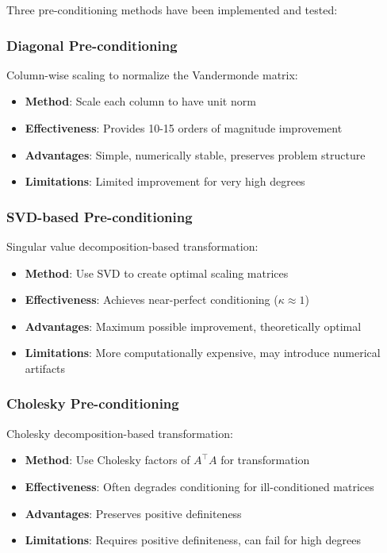 \documentclass[11pt,a4paper]{article}
\begin{document}
Three pre-conditioning methods have been implemented and tested:

\subsubsection{Diagonal Pre-conditioning}

Column-wise scaling to normalize the Vandermonde matrix:
\begin{itemize}
    \item \textbf{Method}: Scale each column to have unit norm
    \item \textbf{Effectiveness}: Provides 10-15 orders of magnitude improvement
    \item \textbf{Advantages}: Simple, numerically stable, preserves problem structure
    \item \textbf{Limitations}: Limited improvement for very high degrees
\end{itemize}

\subsubsection{SVD-based Pre-conditioning}

Singular value decomposition-based transformation:
\begin{itemize}
    \item \textbf{Method}: Use SVD to create optimal scaling matrices
    \item \textbf{Effectiveness}: Achieves near-perfect conditioning ($\kappa \approx 1$)
    \item \textbf{Advantages}: Maximum possible improvement, theoretically optimal
    \item \textbf{Limitations}: More computationally expensive, may introduce numerical artifacts
\end{itemize}

\subsubsection{Cholesky Pre-conditioning}

Cholesky decomposition-based transformation:
\begin{itemize}
    \item \textbf{Method}: Use Cholesky factors of $A^\top A$ for transformation
    \item \textbf{Effectiveness}: Often degrades conditioning for ill-conditioned matrices
    \item \textbf{Advantages}: Preserves positive definiteness
    \item \textbf{Limitations}: Requires positive definiteness, can fail for high degrees
\end{itemize}
\end{document}
